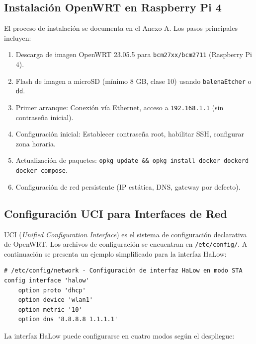 \subsection{Instalación OpenWRT en Raspberry Pi 4}

El proceso de instalación se documenta en el Anexo A. Los pasos principales incluyen:

\begin{enumerate}
    \item Descarga de imagen OpenWRT 23.05.5 para \texttt{bcm27xx/bcm2711} (Raspberry Pi 4).
    \item Flash de imagen a microSD (mínimo 8 GB, clase 10) usando \texttt{balenaEtcher} o \texttt{dd}.
    \item Primer arranque: Conexión vía Ethernet, acceso a \texttt{192.168.1.1} (sin contraseña inicial).
    \item Configuración inicial: Establecer contraseña root, habilitar SSH, configurar zona horaria.
    \item Actualización de paquetes: \texttt{opkg update \&\& opkg install docker dockerd docker-compose}.
    \item Configuración de red persistente (IP estática, DNS, gateway por defecto).
\end{enumerate}

\subsection{Configuración UCI para Interfaces de Red}

UCI (\textit{Unified Configuration Interface}) es el sistema de configuración declarativa de OpenWRT. Los archivos de configuración se encuentran en \texttt{/etc/config/}. A continuación se presenta un ejemplo simplificado para la interfaz HaLow:

\begin{verbatim}
# /etc/config/network - Configuración de interfaz HaLow en modo STA
config interface 'halow'
    option proto 'dhcp'
    option device 'wlan1'
    option metric '10'
    option dns '8.8.8.8 1.1.1.1'
\end{verbatim}

La interfaz HaLow puede configurarse en cuatro modos según el despliegue:


